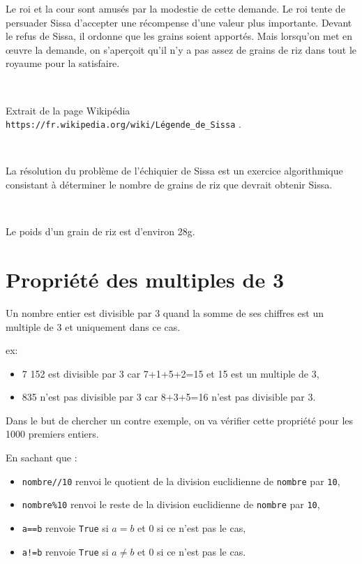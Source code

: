Le roi et la cour sont amusés par la modestie de cette demande. Le roi tente de persuader Sissa d'accepter une récompense d'une valeur plus importante. Devant le refus de Sissa, il ordonne que les grains soient apportés. Mais lorsqu'on met en \oe uvre la demande, on s'aperçoit qu'il n'y a pas assez de grains de riz dans tout le royaume pour la satisfaire. 

~\

Extrait de la page Wikipédia \og \texttt{https://fr.wikipedia.org/wiki/Légende\_de\_Sissa} \fg.

~\

La résolution du problème de l'échiquier de Sissa est un exercice algorithmique consistant à déterminer le nombre de grains de riz que devrait obtenir Sissa.


~\

Le poids d'un grain de riz est d'environ 28g.


\section{Propriété des multiples de 3}

Un nombre entier est divisible par 3 quand la somme de ses chiffres est un multiple de 3 et uniquement dans ce cas.

ex:
\begin{itemize}
 \item 7 152 est divisible par 3 car 7+1+5+2=15 et 15 est un multiple de 3,
 \item 835 n'est pas divisible par 3 car 8+3+5=16 n'est pas divisible par 3.
\end{itemize}

Dans le but de chercher un contre exemple, on va vérifier cette propriété pour les 1000 premiers entiers.

En sachant que :
\begin{itemize}
 \item \texttt{nombre//10} renvoi le quotient de la division euclidienne de \texttt{nombre} par \texttt{10},
 \item \texttt{nombre\%10} renvoi le reste de la division euclidienne de \texttt{nombre} par \texttt{10},
 \item \texttt{a==b} renvoie \texttt{True} si $a=b$ et 0 si ce n'est pas le cas,
 \item \texttt{a!=b} renvoie \texttt{True} si $a\neq b$ et 0 si ce n'est pas le cas.
\end{itemize}

